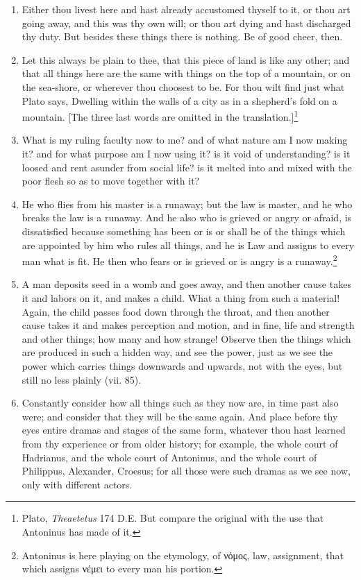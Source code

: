 \begin{enumerate}
\item Either thou livest here and hast already accustomed thyself to it, or thou art going away, and this was thy own will; or thou art dying and hast discharged thy duty. But besides these things there is nothing. Be of good cheer, then.

\item Let this always be plain to thee, that this piece of land is like any other; and that all things here are the same with things on the top of a mountain, or on the sea-shore, or wherever thou choosest to be. For thou wilt find just what Plato says, Dwelling within the walls of a city as in a shepherd's fold on a mountain. [{\clarify The three last words are omitted in the translation.}]\footnote{Plato, \textit{Theaetetus} 174 D.E. But compare the original with the use that Antoninus has made of it.}

\item What is my ruling faculty now to me? and of what nature am I now making it? and for what purpose am I now using it? is it void of understanding? is it loosed and rent asunder from social life? is it melted into and mixed with the poor flesh so as to move together with it?

\item He who flies from his master is a runaway; but the law is master, and he who breaks the law is a runaway. And he also who is grieved or angry or afraid, is dissatisfied because something has been or is or shall be of the things which are appointed by him who rules all things, and he is Law and assigns to every man what is fit. He then who fears or is grieved or is angry is a runaway.\footnote{Antoninus is here playing on the etymology, of \textgreek{νόμος}, law, assignment, that which assigns \textgreek{νέμει} to every man his portion.}

\item A man deposits seed in a womb and goes away, and then another cause takes it and labors on it, and makes a child. What a thing from such a material! Again, the child passes food down through the throat, and then another cause takes it and makes perception and motion, and in fine, life and strength and other things; how many and how strange! Observe then the things which are produced in such a hidden way, and see the power, just as we see the power which carries things downwards and upwards, not with the eyes, but still no less plainly (vii. 85).

\item Constantly consider how all things such as they now are, in time past also were; and consider that they will be the same again. And place before thy eyes entire dramas and stages of the same form, whatever thou hast learned from thy experience or from older history; for example, the whole court of Hadrianus, and the whole court of Antoninus, and the whole court of Philippus, Alexander, Croesus; for all those were such dramas as we see now, only with different actors.


\end{enumerate}
